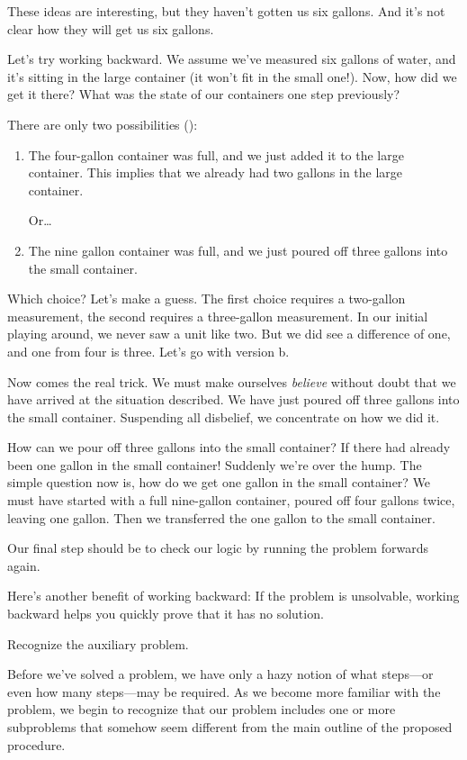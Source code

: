 These ideas are interesting, but they haven't gotten us six gallons.
And it's not clear how they will get us six gallons.

Let's try working backward. We assume we've measured six gallons
of water, and it's sitting in the large container (it won't fit in the
small one!). Now, how did we get it there? What was the state of our
containers one step previously?

There are only two possibilities ():
\begin{enumerate}
\item The four-gallon container was full, and we just added it to the large
   container. This implies that we already had two gallons in the large
   container.

   Or\dots{}
\item The nine gallon container was full, and we just poured off three gallons
   into the small container.
\end{enumerate}
Which choice? Let's make a guess. The first choice requires a two-gallon
measurement, the second requires a three-gallon measurement. In our initial
playing around, we never saw a unit like two. But we did see a difference
of one, and one from four is three. Let's go with version b.

Now comes the real trick. We must make ourselves \emph{believe} without
doubt that we have arrived at the situation described. We have just
poured off three gallons into the small container. Suspending all disbelief,
we concentrate on how we did it.

How can we pour off three gallons into the small container? If there
had already been one gallon in the small container! Suddenly we're over
the hump. The simple question now is, how do we get one gallon in the
small container? We must have started with a full nine-gallon container,
poured off four gallons twice, leaving one gallon. Then we transferred the
one gallon to the small container.






Our final step should be to check our logic by running the problem
forwards again.

Here's another benefit of working backward: If the problem is unsolvable,
working backward helps you quickly prove that it has no solution.
\begin{tip}
Recognize the auxiliary problem.
\end{tip}
Before we've solved a problem, we have only a hazy notion of what
steps---or even how many steps---may be required. As we become more
familiar with the problem, we begin to recognize that our problem
includes one or more subproblems that somehow seem different from the
main outline of the proposed procedure.

